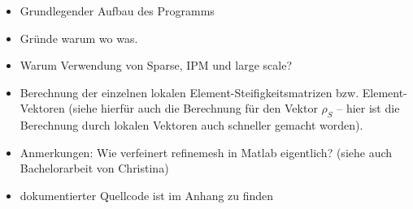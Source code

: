 
\begin{itemize}
\item Grundlegender Aufbau des Programms
\item Gründe warum wo was.
\item Warum Verwendung von Sparse, IPM und large scale?
\item Berechnung der einzelnen lokalen Element-Steifigkeitsmatrizen bzw. Element-Vektoren (siehe hierfür auch die Berechnung für den Vektor $\rho_S$ – hier ist die Berechnung durch lokalen Vektoren auch schneller gemacht worden).
\item Anmerkungen: Wie verfeinert refinemesh in Matlab eigentlich? (siehe auch Bachelorarbeit von Christina)
\item dokumentierter Quellcode ist im Anhang zu finden
\end{itemize}

\newpage

